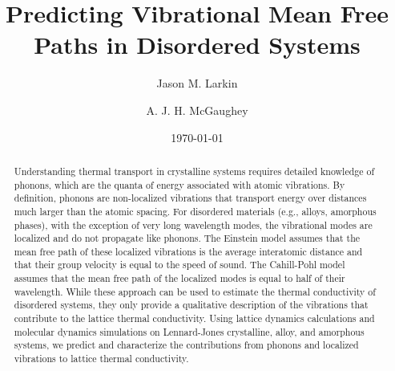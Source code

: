 \documentclass[aps,prb,preprint,superscriptaddress,amsmath,amssymb,floatfix]{revtex4}
\begin{document}
\title{Predicting Vibrational Mean Free Paths in Disordered Systems}
\author{Jason M. Larkin}
\author{A. J. H. McGaughey}
\date{\today}
\begin{abstract}
Understanding thermal transport in crystalline systems requires detailed 
knowledge of phonons, which are the quanta of energy associated with atomic 
vibrations. By definition, phonons are non-localized vibrations that 
transport energy over distances much larger than the atomic spacing. For 
disordered materials (e.g., alloys, amorphous phases), with the exception 
of very long wavelength modes, the vibrational modes are localized and do 
not propagate like phonons. The Einstein model assumes that the mean free 
path of these localized vibrations is the average interatomic distance and 
that their group velocity is equal to the speed of sound. The Cahill-Pohl 
model assumes that the mean free path of the localized modes is equal to 
half of their wavelength. While these approach can be used to estimate the 
thermal conductivity of disordered systems, they only 
provide a qualitative description of the vibrations that contribute to the 
lattice thermal conductivity.
Using lattice dynamics calculations and molecular dynamics simulations on 
Lennard-Jones crystalline, alloy, and amorphous systems, we predict and 
characterize the contributions from phonons and localized vibrations to 
lattice thermal conductivity. 

\end{abstract}
\maketitle
\clearpage
\end{document}
